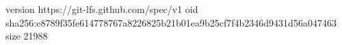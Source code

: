 version https://git-lfs.github.com/spec/v1
oid sha256:e8789f35fe614778767a8226825b21b01ea9b25cf7f4b2346d9431d56a047463
size 21988
